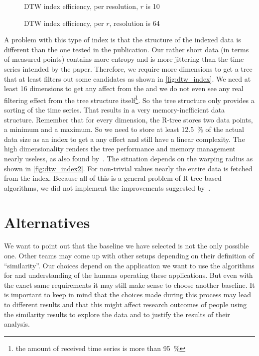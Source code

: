 \begin{figure}
    \centering
    
    \caption{DTW index efficiency, per resolution, $r$ is \num{10}}\label{fig:dtw_index}
\end{figure}

\begin{figure}
    \centering
    
    \caption{DTW index efficiency, per $r$, resolution is \num{64}}\label{fig:dtw_index2}
\end{figure}

A problem with this type of index is that the structure of the indexed data is different than the one tested in the publication. Our rather short data (in terms of measured points) contains more entropy and is more jittering than the time series intended by the paper. Therefore, we require more dimensions to get a tree that at least filters out some candidates as shown in \autoref{fig:dtw_index}. We need at least \num{16} dimensions to get any affect from the  and we do not even see any real filtering effect from the tree structure itself\footnote{the amount of received time series is more than \SI{95}{\percent}}. So the tree structure only provides a sorting of the time series. That results in a very memory-inefficient data structure. Remember that for every dimension, the R-tree stores two data points, a minimum and a maximum. So we need to store at least \SI{12.5}{\percent} of the actual data size as an index to get a any effect and still have a linear complexity. The high dimensionality renders the tree performance and memory management nearly useless, as also found by~\cite{rtree_highdim}. The situation depends on the warping radius as shown in \autoref{fig:dtw_index2}. For non-trivial values nearly the entire data is fetched from the index. Because all of this is a general problem of R-tree-based algorithms, we did not implement the improvements suggested by~\cite{LB_Improved}.



\section{Alternatives}
\label{sec:baseline:alt}

We want to point out that the baseline we have selected is not the only possible one. Other teams may come up with other setups depending on their definition of \enquote{similarity}. Our choices depend on the application we want to use the algorithms for and understanding of the humans operating these applications. But even with the exact same requirements it may still make sense to choose another baseline. It is important to keep in mind that the choices made during this process may lead to different results and that this might affect research outcomes of people using the similarity results to explore the data and to justify the results of their analysis.
